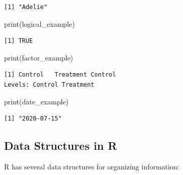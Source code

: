 \documentclass[
  letterpaper,
]{book}
\newenvironment{Shaded}{\begin{snugshade}}{\end{snugshade}}
\newcommand{\CommentTok}[1]{\textcolor[rgb]{0.37,0.37,0.37}{#1}}
\newcommand{\DecValTok}[1]{\textcolor[rgb]{0.68,0.00,0.00}{#1}}
\newcommand{\FunctionTok}[1]{\textcolor[rgb]{0.28,0.35,0.67}{#1}}
\newcommand{\NormalTok}[1]{\textcolor[rgb]{0.00,0.23,0.31}{#1}}
\newcommand{\OtherTok}[1]{\textcolor[rgb]{0.00,0.23,0.31}{#1}}
\newcommand{\SpecialCharTok}[1]{\textcolor[rgb]{0.37,0.37,0.37}{#1}}
\newcommand{\StringTok}[1]{\textcolor[rgb]{0.13,0.47,0.30}{#1}}
\begin{document}
\begin{verbatim}
[1] "Adelie"
\end{verbatim}

\begin{Shaded}
\begin{Highlighting}[]
\FunctionTok{print}\NormalTok{(logical\_example)}
\end{Highlighting}
\end{Shaded}

\begin{verbatim}
[1] TRUE
\end{verbatim}

\begin{Shaded}
\begin{Highlighting}[]
\FunctionTok{print}\NormalTok{(factor\_example)}
\end{Highlighting}
\end{Shaded}

\begin{verbatim}
[1] Control   Treatment Control  
Levels: Control Treatment
\end{verbatim}

\begin{Shaded}
\begin{Highlighting}[]
\FunctionTok{print}\NormalTok{(date\_example)}
\end{Highlighting}
\end{Shaded}

\begin{verbatim}
[1] "2020-07-15"
\end{verbatim}

\subsection{Data Structures in R}\label{data-structures-in-r}

R has several data structures for organizing information:

\begin{Shaded}
\end{Shaded}
\end{document}
